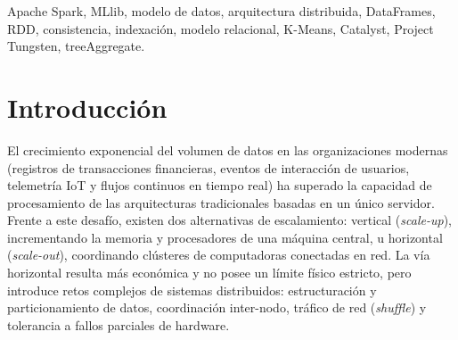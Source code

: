 \documentclass[conference,a4paper]{IEEEtran}
\begin{document}
\begin{abstract}
Cuando el volumen de un conjunto de datos excede las capacidades físicas de un único servidor, su tratamiento exige estrategias de particionamiento horizontal y cómputo paralelo en clúster. Este informe analiza integralmente el procesamiento distribuido moderno en Apache Spark y su biblioteca de aprendizaje automático, MLlib. Se examina formalmente el modelo de datos (RDDs, DataFrames estructurados bajo esquemas \textit{StructType} y formatos columnares particionados en disco como Parquet), la arquitectura interna de ejecución (distribución por particiones, ausencia deliberada de replicación en memoria y resiliencia por linaje determinista, técnicas de aceleración por poda y filtros de Bloom en lugar de índices B-Tree, y consistencia mediante protocolos de confirmación atómica y capas transaccionales). Asimismo, se establece una comparación fundamentada con el modelo relacional tradicional, delimitando casos de uso analíticos reales y escenarios donde no conviene utilizar la tecnología. Finalmente, se presentan ejemplos de operaciones concretas (consultas declarativas, escrituras particionadas y canalizaciones completas de ML), formalizando la paralelización del algoritmo K-Means con agregación jerárquica en árbol (\textit{treeAggregate}) y las optimizaciones de bajo nivel de Catalyst y Project Tungsten.
\end{abstract}

\begin{IEEEkeywords}
Apache Spark, MLlib, modelo de datos, arquitectura distribuida, DataFrames, RDD, consistencia, indexación, modelo relacional, K-Means, Catalyst, Project Tungsten, treeAggregate.
\end{IEEEkeywords}

\section{Introducción}

El crecimiento exponencial del volumen de datos en las organizaciones modernas (registros de transacciones financieras, eventos de interacción de usuarios, telemetría IoT y flujos continuos en tiempo real) ha superado la capacidad de procesamiento de las arquitecturas tradicionales basadas en un único servidor. Frente a este desafío, existen dos alternativas de escalamiento: vertical (\textit{scale-up}), incrementando la memoria y procesadores de una máquina central, u horizontal (\textit{scale-out}), coordinando clústeres de computadoras conectadas en red. La vía horizontal resulta más económica y no posee un límite físico estricto, pero introduce retos complejos de sistemas distribuidos: estructuración y particionamiento de datos, coordinación inter-nodo, tráfico de red (\textit{shuffle}) y tolerancia a fallos parciales de hardware.
\end{document}
